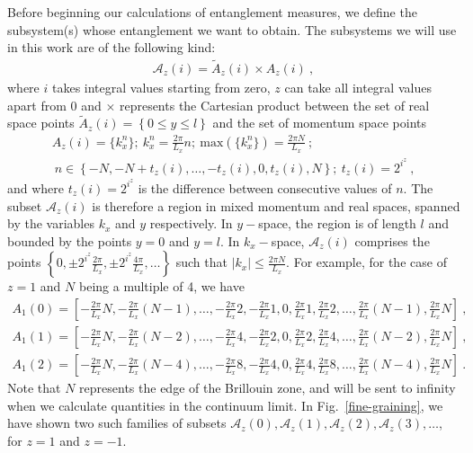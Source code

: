 Before beginning our calculations of entanglement measures, we define the subsystem(s) whose entanglement we want to obtain. The subsystems we will use in this work are of the following kind:
\begin{equation}\begin{aligned}
	\mathcal{A}_{z}(i) = \widetilde{A}_{z}(i) \times A_{z}(i)~,
\end{aligned}\end{equation}
where \(i\) takes integral values starting from zero, \(z\) can take all integral values apart from 0 and \(\times\) represents the Cartesian product between the set of real space points \(\widetilde{A}_{z}(i) = \left\{0\leq y \leq l\right\}\) and the set of momentum space points 
\begin{gather}
	A_{z}(i) = \bigg\{k_x^n\bigg\};~ k_x^n = \frac{2\pi}{L_x}n;~\text{max}(\{k_x^n\}) = \frac{2\pi N}{L_x}~;\nonumber\\
	~ n \in \left\{-N, -N + t_{z}(i),\ldots,-t_{z}(i),0,t_{z}(i),N\right\};~ t_{z}(i) = 2^{i^z}~,
\end{gather}
and where \(t_{z}(i) = 2^{i^z}\) is the difference between consecutive values of \(n\).
The subset \(\mathcal{A}_{z}(i)\) is therefore a region in mixed momentum and real spaces, spanned by the variables \(k_x\) and \(y\) respectively. In \(y-\)space, the region is of length \(l\) and bounded by the points \(y=0\) and \(y=l\). In \(k_x-\)space, \(\mathcal{A}_{z}(i)\) comprises the points \(\left\{0,\pm 2^{i^z} \frac{2\pi}{L_x},\pm 2^{i^z} \frac{4\pi}{L_x},\ldots\right\}\) such that \(|k_x| \leq \frac{2\pi N}{L_x}\). For example, for the case of \(z=1\) and \(N\) being a multiple of 4, we have
\begin{equation}\begin{aligned}
	A_{1}(0) = \left[-\frac{2\pi}{L_x}N, -\frac{2\pi}{L_x}(N-1), \ldots, -\frac{2\pi}{L_x}2, -\frac{2\pi}{L_x}1, 0,\frac{2\pi}{L_x}1, \frac{2\pi}{L_x}2, \ldots, \frac{2\pi}{L_x}(N-1), \frac{2\pi}{L_x}N\right] ~,\\
	A_{1}(1) = \left[-\frac{2\pi}{L_x}N, -\frac{2\pi}{L_x}(N-2), \ldots, -\frac{2\pi}{L_x}4, -\frac{2\pi}{L_x}2, 0,\frac{2\pi}{L_x}2, \frac{2\pi}{L_x}4, \ldots, \frac{2\pi}{L_x}(N-2), \frac{2\pi}{L_x}N\right] ~,\\
	A_{1}(2) = \left[-\frac{2\pi}{L_x}N, -\frac{2\pi}{L_x}(N-4), \ldots, -\frac{2\pi}{L_x}8, -\frac{2\pi}{L_x}4, 0,\frac{2\pi}{L_x}4, \frac{2\pi}{L_x}8, \ldots, \frac{2\pi}{L_x}(N-4), \frac{2\pi}{L_x}N\right]~.
\end{aligned}\end{equation}
Note that \(N\) represents the edge of the Brillouin zone, and will be sent to infinity when we calculate quantities in the continuum limit. In Fig.~\ref{fine-graining}, we have shown two such families of subsets \(\mathcal{A}_z(0), \mathcal{A}_z(1), \mathcal{A}_z(2), \mathcal{A}_z(3), \ldots\), for \(z=1\) and \(z=-1\).

